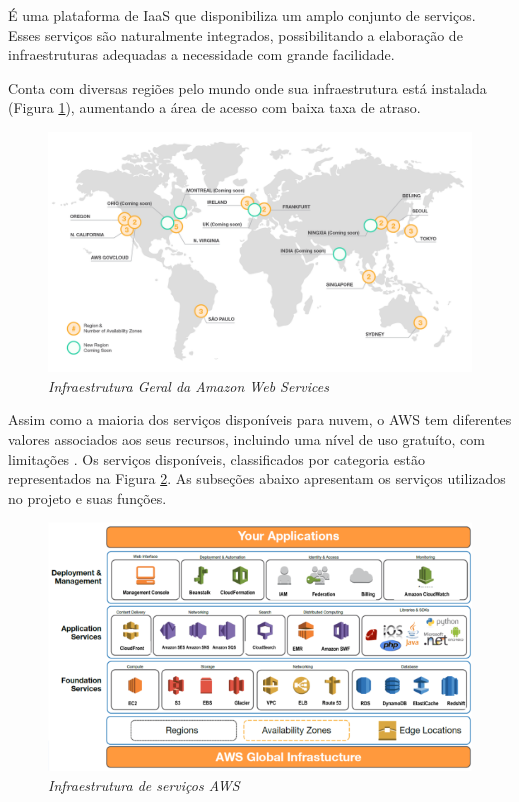 \documentclass[tg]{mdtufsm}
\begin{document}
É uma plataforma de IaaS que disponibiliza um amplo conjunto de serviços. Esses serviços são naturalmente integrados, possibilitando a elaboração de infraestruturas adequadas a necessidade com grande facilidade.

Conta com diversas regiões pelo mundo onde sua infraestrutura está instalada (Figura \ref{fig:awsInfra}), aumentando a área de acesso com baixa taxa de atraso.

\begin{figure}
	\centering
	\includegraphics[width=1\textwidth]{aws-infrastructure}
	\caption{\emph{Infraestrutura Geral da Amazon Web Services \cite{awsinfra}}}
	\label{fig:awsInfra}
\end{figure}

Assim como a maioria dos serviços disponíveis para nuvem, o AWS tem diferentes valores associados aos seus recursos, incluindo uma nível de uso gratuíto, com limitações \cite{ec2price}. Os serviços disponíveis, classificados por categoria estão representados na Figura \ref{fig:awsArq}. As subseções abaixo apresentam os serviços utilizados no projeto e suas funções.

\begin{figure}
	\centering
	\includegraphics[width=1\textwidth]{aws-arq}
	\caption{\emph{Infraestrutura de serviços AWS \cite{awsarq}}}
	\label{fig:awsArq}
\end{figure}
\end{document}
